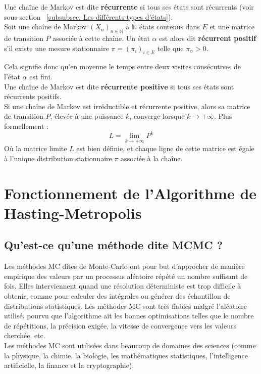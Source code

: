 \documentclass{article}
\begin{document}
Une chaîne de Markov est dite \textbf{récurrente} si tous ses états sont récurrents (voir sous-section ~\ref{subsubsec: Les différents types d'états}). \\ %

Soit une chaîne de Markov $(X_n)_{n \in \mathbb{N}}$ à $\mathbb{N}$ états contenus dans $E$ et une matrice de transition $P$ associée à cette chaîne. Un état $\alpha$ est alors dit \textbf{récurrent positif} s'il existe une mesure stationnaire $\pi = (\pi_i)_{i \in E}$ telle que $\pi_\alpha > 0$.

Cela signifie donc qu'en moyenne le temps entre deux visites consécutives de l'état $\alpha$ est fini. \\

Une chaîne de Markov est dite \textbf{récurrente positive} si tous ses états sont récurrents positifs. \\

Si une chaîne de Markov est irréductible et récurrente positive, alors sa matrice de transition $P$, élevée à une puissance $k$, converge lorsque $k \to +\infty$. Plus formellement :
\[
L = \lim_{k \to +\infty} P^k
\]
Où la matrice limite $L$ est bien définie, et chaque ligne de cette matrice est égale à l'unique distribution stationnaire $\pi$ associée à la chaîne.

\newpage
\section{Fonctionnement de l'Algorithme de Hasting-Metropolis}

\subsection{Qu'est-ce qu'une méthode dite MCMC ?}

Les méthodes MC dites de Monte-Carlo ont pour but d'approcher de manière empirique des valeurs par un processus aléatoire répété un nombre suffisant de fois. Elles interviennent quand une résolution déterministe est trop difficile à obtenir, comme pour calculer des intégrales ou générer des échantillon de distributions statistiques. Les méthodes MC sont très fiables malgré l'aléatoire utilisé, pourvu que l'algorithme ait les bonnes optimisations telles que le nombre de répétitions, la précision exigée, la vitesse de convergence vers les valeurs cherchée, etc. \\
Les méthodes MC sont utilisées dans beaucoup de domaines des sciences (comme la physique, la chimie, la biologie, les mathématiques statistiques, l'intelligence artificielle, la finance et la cryptographie). \\
\end{document}
